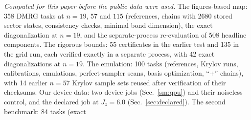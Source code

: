 \documentclass[aps,prx,onecolumn,10pt,nofootinbib,longbibliography,floatfix]{revtex4-2}
\theoremstyle{remark}
\newcommand{\Jz}{J_z}
\begin{document}
\emph{Computed for this paper before the public data were used.} The figures-based map: 358 DMRG tasks at $n=19$, $57$ and $115$ (references, chains with 2680 stored %
sector states, consistency checks, minimal bond dimension), the exact diagonalization at $n=19$, and the %
separate-process re-evaluation of 508 headline components. The rigorous bounds: 55 certificates in the earlier test and %
135 in the grid run, each verified exactly in a separate process, with 42 exact diagonalizations at $n=19$. The %
emulation: 100 tasks (references, Krylov runs, calibrations, emulations, perfect-sampler scans, basis optimization, %
``$+$'' chains), with 14 earlier $n=57$ Krylov sample sets reused after verification of their checksums. Our device %
data: two device jobs (Sec.~\ref{sm:qpu}) and their noiseless control, and the declared job at $\Jz=6.0$ %
(Sec.~\ref{sec:declared}). The second benchmark: 84 tasks (exact %
\end{document}
